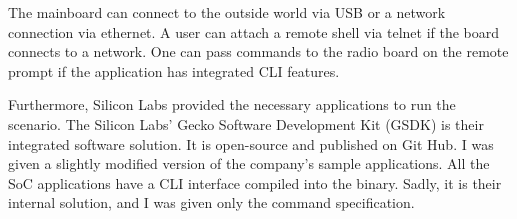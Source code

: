 The mainboard can connect to the outside world via USB or a network connection via ethernet. A user can attach a remote shell via telnet if the board connects to a network. One can pass commands to the radio board on the remote prompt if the application has integrated CLI features.

Furthermore, Silicon Labs provided the necessary applications to run the scenario. The Silicon Labs' Gecko Software Development Kit (GSDK) is their integrated software solution. It is open-source and published on Git Hub\cite{silabs_gsdk:2023}. I was given a slightly modified version of the company's sample applications. All the SoC applications have a CLI interface compiled into the binary. Sadly, it is their internal solution, and I was given only the command specification.
